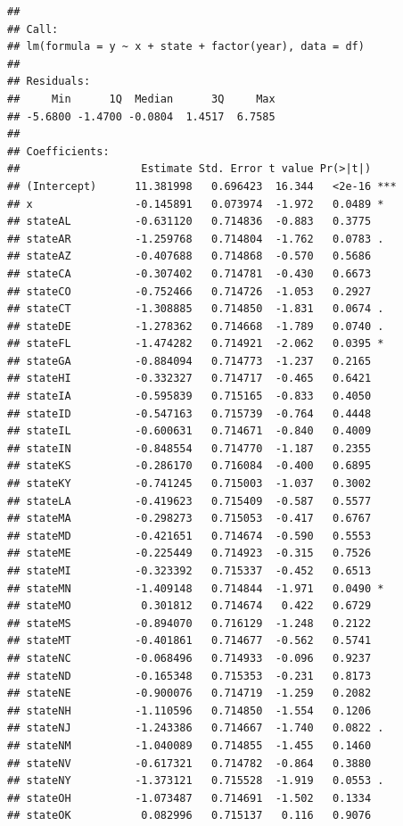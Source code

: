 \documentclass[]{book}
\theoremstyle{definition}
\theoremstyle{definition}
\theoremstyle{definition}
\theoremstyle{remark}
\begin{document}
\begin{verbatim}
## 
## Call:
## lm(formula = y ~ x + state + factor(year), data = df)
## 
## Residuals:
##     Min      1Q  Median      3Q     Max 
## -5.6800 -1.4700 -0.0804  1.4517  6.7585 
## 
## Coefficients:
##                   Estimate Std. Error t value Pr(>|t|)    
## (Intercept)      11.381998   0.696423  16.344   <2e-16 ***
## x                -0.145891   0.073974  -1.972   0.0489 *  
## stateAL          -0.631120   0.714836  -0.883   0.3775    
## stateAR          -1.259768   0.714804  -1.762   0.0783 .  
## stateAZ          -0.407688   0.714868  -0.570   0.5686    
## stateCA          -0.307402   0.714781  -0.430   0.6673    
## stateCO          -0.752466   0.714726  -1.053   0.2927    
## stateCT          -1.308885   0.714850  -1.831   0.0674 .  
## stateDE          -1.278362   0.714668  -1.789   0.0740 .  
## stateFL          -1.474282   0.714921  -2.062   0.0395 *  
## stateGA          -0.884094   0.714773  -1.237   0.2165    
## stateHI          -0.332327   0.714717  -0.465   0.6421    
## stateIA          -0.595839   0.715165  -0.833   0.4050    
## stateID          -0.547163   0.715739  -0.764   0.4448    
## stateIL          -0.600631   0.714671  -0.840   0.4009    
## stateIN          -0.848554   0.714770  -1.187   0.2355    
## stateKS          -0.286170   0.716084  -0.400   0.6895    
## stateKY          -0.741245   0.715003  -1.037   0.3002    
## stateLA          -0.419623   0.715409  -0.587   0.5577    
## stateMA          -0.298273   0.715053  -0.417   0.6767    
## stateMD          -0.421651   0.714674  -0.590   0.5553    
## stateME          -0.225449   0.714923  -0.315   0.7526    
## stateMI          -0.323392   0.715337  -0.452   0.6513    
## stateMN          -1.409148   0.714844  -1.971   0.0490 *  
## stateMO           0.301812   0.714674   0.422   0.6729    
## stateMS          -0.894070   0.716129  -1.248   0.2122    
## stateMT          -0.401861   0.714677  -0.562   0.5741    
## stateNC          -0.068496   0.714933  -0.096   0.9237    
## stateND          -0.165348   0.715353  -0.231   0.8173    
## stateNE          -0.900076   0.714719  -1.259   0.2082    
## stateNH          -1.110596   0.714850  -1.554   0.1206    
## stateNJ          -1.243386   0.714667  -1.740   0.0822 .  
## stateNM          -1.040089   0.714855  -1.455   0.1460    
## stateNV          -0.617321   0.714782  -0.864   0.3880    
## stateNY          -1.373121   0.715528  -1.919   0.0553 .  
## stateOH          -1.073487   0.714691  -1.502   0.1334    
## stateOK           0.082996   0.715137   0.116   0.9076    

\end{verbatim}
\end{document}
